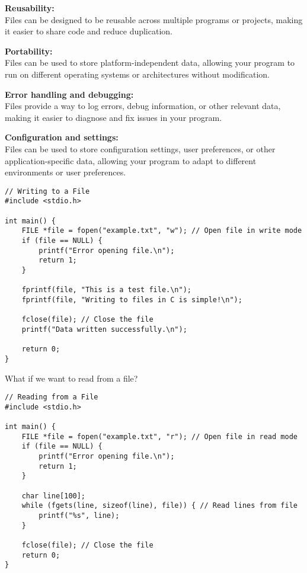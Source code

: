 \documentclass[a4paper,12pt]{article}
\begin{document}
\textbf{Reusability:}\\
Files can be designed to be reusable across multiple programs or projects, making it easier to share code and reduce duplication.

\textbf{Portability:}\\
Files can be used to store platform-independent data, allowing your program to run on different operating systems or architectures without modification.

\textbf{Error handling and debugging:}\\
Files provide a way to log errors, debug information, or other relevant data, making it easier to diagnose and fix issues in your program.

\textbf{Configuration and settings:}\\
Files can be used to store configuration settings, user preferences, or other application-specific data, allowing your program to adapt to different environments or user preferences.

\lstset{language=C}
\begin{lstlisting}
// Writing to a File
#include <stdio.h>

int main() {
    FILE *file = fopen("example.txt", "w"); // Open file in write mode
    if (file == NULL) {
        printf("Error opening file.\n");
        return 1;
    }

    fprintf(file, "This is a test file.\n");
    fprintf(file, "Writing to files in C is simple!\n");

    fclose(file); // Close the file
    printf("Data written successfully.\n");

    return 0;
}
\end{lstlisting}

\newpage

What if we want to read from a file?

\lstset{language=C}
\begin{lstlisting}
// Reading from a File
#include <stdio.h>

int main() {
    FILE *file = fopen("example.txt", "r"); // Open file in read mode
    if (file == NULL) {
        printf("Error opening file.\n");
        return 1;
    }

    char line[100];
    while (fgets(line, sizeof(line), file)) { // Read lines from file
        printf("%s", line);
    }

    fclose(file); // Close the file
    return 0;
}

\end{lstlisting}
\end{document}
